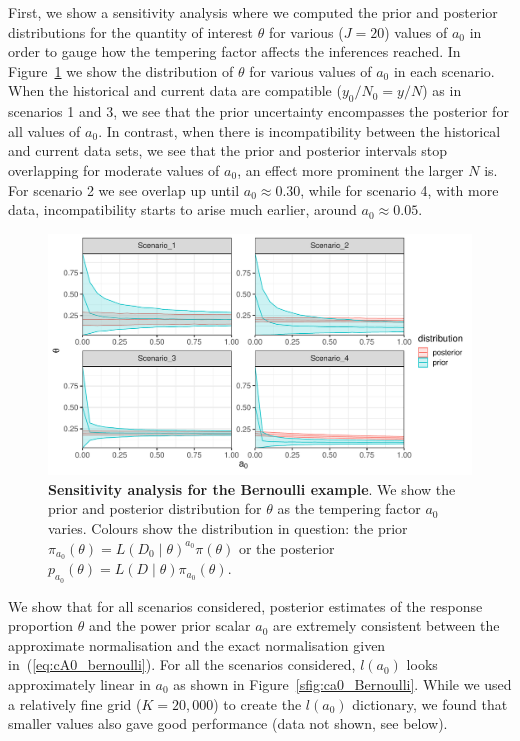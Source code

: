 \documentclass[a4paper, notitlepage, 11pt]{article}
\begin{document}
First, we show a sensitivity analysis where we computed the prior and posterior distributions for the quantity of interest $\theta$ for various ($J=20$) values of $a_0$ in order to gauge how the tempering factor affects the inferences reached. 
In Figure~\ref{fig:Bernoulli_sensanalysis} we show the distribution of $\theta$ for various values of $a_0$ in each scenario.
When the historical and current data are compatible ($y_0/N_0 = y/N$) as in scenarios 1 and 3, we see that the prior uncertainty encompasses the posterior for all values of $a_0$.
In contrast, when there is incompatibility between the historical and current data sets, we see that the prior and posterior intervals stop overlapping for moderate values of $a_0$, an effect more prominent the larger $N$ is.
For scenario 2  we see overlap up until $a_0 \approx 0.30$, while for scenario 4, with more data, incompatibility starts to arise much earlier, around $a_0 \approx 0.05$.

\begin{figure}[!ht]
\begin{center}
\includegraphics[scale=0.6]{../figures/prior_posterior_sensitivity_Bernoulli_allscenarios_J=20.pdf}
\end{center}
\caption{\textbf{Sensitivity analysis for the Bernoulli example}.
We show the prior and posterior distribution for $\theta$ as the tempering factor $a_0$ varies.
Colours show the distribution in question:  the prior $\pi_{a_0}(\theta) = L(D_0 \mid \theta)^{a_0}\pi(\theta)$ or the posterior $p_{a_0}(\theta) = L(D\mid \theta)\pi_{a_0}(\theta)$.
}
\label{fig:Bernoulli_sensanalysis}
\end{figure}

We show that for all scenarios considered, posterior estimates of the response proportion $\theta$ and the power prior scalar $a_0$ are extremely consistent between the approximate normalisation and the exact normalisation given in~(\ref{eq:cA0_bernoulli}).
For all the scenarios considered, $l(a_0)$ looks approximately linear in $a_0$ as shown in Figure~\ref{sfig:ca0_Bernoulli}.
While we used a relatively fine grid ($K = 20, 000$) to create the $l(a_0)$ dictionary, we found that smaller values also gave good performance (data not shown, see below).
\end{document}
